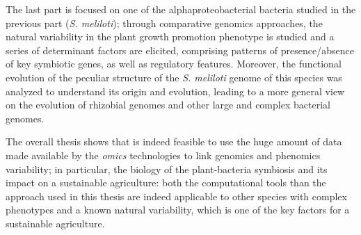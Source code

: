The last part is focused on one of the alphaproteobacterial bacteria studied in the previous part (\textit{S. meliloti}); through comparative genomics approaches, the natural variability in the plant growth promotion phenotype is studied and a series of determinant factors are elicited, comprising patterns of presence/absence of key symbiotic genes, as well as regulatory features. Moreover, the functional evolution of the peculiar structure of the \textit{S. meliloti} genome of this species was analyzed to understand its origin and evolution, leading to a more general view on the evolution of rhizobial genomes and other large and complex bacterial genomes.

The overall thesis shows that is indeed feasible to use the huge amount of data made available by the \textit{omics} technologies to link genomics and phenomics variability; in particular, the biology of the plant-bacteria symbiosis and its impact on a sustainable agriculture: both the computational tools than the approach used in this thesis are indeed applicable to other species with complex phenotypes and a known natural variability, which is one of the key factors for a sustainable agriculture.